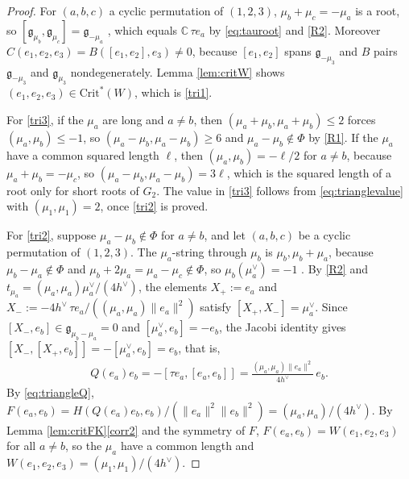 \documentclass[leqno,10pt]{amsart}
\theoremstyle{definition}
\numberwithin{equation}{section}
\newcommand{\g}{\mathfrak{g}}
\newcommand{\com}{\mathbb C}
\newcommand{\crtnt}{\mathrm{Crit}^*}
\newcommand{\hv}{h^\vee}
\newcommand{\norm}[1]{\lVert #1\rVert}
\newcommand{\qad}{Q}
\begin{document}
\begin{proof}
For $(a, b, c)$ a cyclic permutation of $(1, 2, 3)$, $\mu_{b} + \mu_{c} = -\mu_{a}$ is a root, so $[\g_{\mu_{b}}, \g_{\mu_{c}}] = \g_{-\mu_{a}}$ \cite[Proposition~8.4]{Humphreys}, which equals $\com\,\tau e_{a}$ by \eqref{eq:tauroot} and \ref{R2}. Moreover $C(e_{1}, e_{2}, e_{3}) = B([e_{1}, e_{2}], e_{3}) \neq 0$, because $[e_{1}, e_{2}]$ spans $\g_{-\mu_{3}}$ and $B$ pairs $\g_{-\mu_{3}}$ and $\g_{\mu_{3}}$ nondegenerately. Lemma \ref{lem:critW} shows $(e_{1}, e_{2}, e_{3}) \in \crtnt(W)$, which is \ref{tri1}.

For \ref{tri3}, if the $\mu_{a}$ are long and $a \neq b$, then $(\mu_{a} + \mu_{b}, \mu_{a} + \mu_{b}) \leq 2$ forces $(\mu_{a}, \mu_{b}) \leq -1$, so $(\mu_{a} - \mu_{b}, \mu_{a} - \mu_{b}) \geq 6$ and $\mu_{a} - \mu_{b} \notin \Phi$ by \ref{R1}. If the $\mu_{a}$ have a common squared length $\ell$, then $(\mu_{a}, \mu_{b}) = -\ell/2$ for $a \neq b$, because $\mu_{a} + \mu_{b} = -\mu_{c}$, so $(\mu_{a} - \mu_{b}, \mu_{a} - \mu_{b}) = 3\ell$, which is the squared length of a root only for short roots of $G_{2}$. The value in \ref{tri3} follows from \eqref{eq:trianglevalue} with $(\mu_{1}, \mu_{1}) = 2$, once \ref{tri2} is proved.

For \ref{tri2}, suppose $\mu_{a} - \mu_{b} \notin \Phi$ for $a \neq b$, and let $(a, b, c)$ be a cyclic permutation of $(1, 2, 3)$. The $\mu_{a}$-string through $\mu_{b}$ is $\mu_{b}, \mu_{b} + \mu_{a}$, because $\mu_{b} - \mu_{a} \notin \Phi$ and $\mu_{b} + 2\mu_{a} = \mu_{a} - \mu_{c} \notin \Phi$, so $\mu_{b}(\mu_{a}^{\vee}) = -1$ \cite[Proposition~8.4]{Humphreys}. By \ref{R2} and $t_{\mu_{a}} = (\mu_{a}, \mu_{a})\mu_{a}^{\vee}/(4\hv)$, the elements $X_{+} := e_{a}$ and $X_{-} := -4\hv\,\tau e_{a}/((\mu_{a}, \mu_{a})\norm{e_{a}}^{2})$ satisfy $[X_{+}, X_{-}] = \mu_{a}^{\vee}$. Since $[X_{-}, e_{b}] \in \g_{\mu_{b} - \mu_{a}} = 0$ and $[\mu_{a}^{\vee}, e_{b}] = -e_{b}$, the Jacobi identity gives $[X_{-}, [X_{+}, e_{b}]] = -[\mu_{a}^{\vee}, e_{b}] = e_{b}$, that is,
\begin{align}\label{eq:triangleQ}
\qad(e_{a})e_{b} = -[\tau e_{a}, [e_{a}, e_{b}]] = \frac{(\mu_{a}, \mu_{a})\norm{e_{a}}^{2}}{4\hv}\,e_{b}.
\end{align}
By \eqref{eq:triangleQ}, $F(e_{a}, e_{b}) = H(\qad(e_{a})e_{b}, e_{b})/(\norm{e_{a}}^{2}\norm{e_{b}}^{2}) = (\mu_{a}, \mu_{a})/(4\hv)$. By Lemma \ref{lem:critFK}\ref{corr2} and the symmetry of $F$, $F(e_{a}, e_{b}) = W(e_{1}, e_{2}, e_{3})$ for all $a \neq b$, so the $\mu_{a}$ have a common length and $W(e_{1}, e_{2}, e_{3}) = (\mu_{1}, \mu_{1})/(4\hv)$.


\end{proof}
\end{document}
